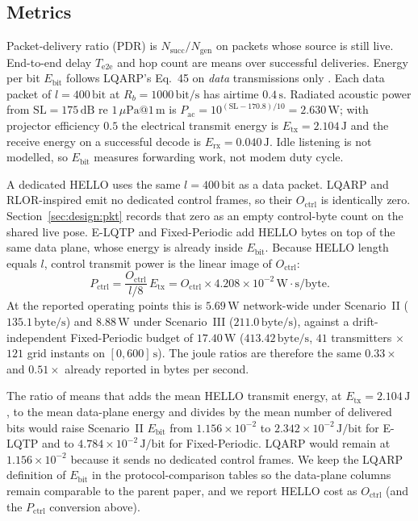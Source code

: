 \subsection{Metrics}
\label{sec:eval:metrics}
Packet-delivery ratio (PDR) is $N_{\mathrm{succ}}/N_{\mathrm{gen}}$
on packets whose source is still live.
End-to-end delay $T_{\mathrm{e2e}}$ and hop count are means over
successful deliveries.
Energy per bit $E_{\mathrm{bit}}$ follows LQARP's Eq.~45 on
\emph{data} transmissions only \cite{liu2026lqarp}.
Each data packet of $l=400\,\mathrm{bit}$ at
$R_b=1000\,\mathrm{bit/s}$ has airtime $0.4\,\mathrm{s}$.
Radiated acoustic power from $\mathrm{SL}=175\,\mathrm{dB}$ re
$1\,\mu\mathrm{Pa}@1\,\mathrm{m}$ is
$P_{\mathrm{ac}}=10^{(\mathrm{SL}-170.8)/10}=2.630\,\mathrm{W}$;
with projector efficiency $0.5$ the electrical transmit energy is
$E_{\mathrm{tx}}=2.104\,\mathrm{J}$ and the receive energy on a
successful decode is $E_{\mathrm{rx}}=0.040\,\mathrm{J}$.
Idle listening is not modelled, so $E_{\mathrm{bit}}$ measures
forwarding work, not modem duty cycle.

A dedicated HELLO uses the same $l=400\,\mathrm{bit}$ as a data
packet.
LQARP and RLOR-inspired emit no dedicated control frames, so their
$O_{\mathrm{ctrl}}$ is identically zero.
Section~\ref{sec:design:pkt} records that zero as an empty
control-byte count on the shared live pose.
E-LQTP and Fixed-Periodic add HELLO bytes on top of the same
data plane, whose energy is already inside $E_{\mathrm{bit}}$.
Because HELLO length equals $l$, control transmit power is the
linear image of $O_{\mathrm{ctrl}}$:
\begin{equation}
\label{eq:pctrl}
P_{\mathrm{ctrl}}
= \frac{O_{\mathrm{ctrl}}}{l/8}\,E_{\mathrm{tx}}
= O_{\mathrm{ctrl}}\times 4.208\times 10^{-2}\,\mathrm{W\cdot s/byte}.
\end{equation}
At the reported operating points this is $5.69\,\mathrm{W}$
network-wide under Scenario~II ($135.1\,\mathrm{byte/s}$) and
$8.88\,\mathrm{W}$ under Scenario~III ($211.0\,\mathrm{byte/s}$),
against a drift-independent Fixed-Periodic budget of
$17.40\,\mathrm{W}$ ($413.42\,\mathrm{byte/s}$, $41$ transmitters
$\times$ $121$ grid instants on $[0,600]\,\mathrm{s}$).
The joule ratios are therefore the same $0.33\times$ and
$0.51\times$ already reported in bytes per second.

The ratio of means that adds the mean HELLO transmit energy,
at $E_{\mathrm{tx}}=2.104\,\mathrm{J}$, to the mean data-plane
energy and divides by the mean number of delivered bits would
raise Scenario~II $E_{\mathrm{bit}}$ from $1.156\times 10^{-2}$
to $2.342\times 10^{-2}\,\mathrm{J/bit}$ for E-LQTP and to
$4.784\times 10^{-2}\,\mathrm{J/bit}$ for Fixed-Periodic.
LQARP would remain at $1.156\times 10^{-2}$ because it sends no
dedicated control frames.
We keep the LQARP definition of $E_{\mathrm{bit}}$ in the
protocol-comparison tables so the data-plane columns remain
comparable to the parent paper, and we report HELLO cost as
$O_{\mathrm{ctrl}}$ (and the $P_{\mathrm{ctrl}}$ conversion above).

